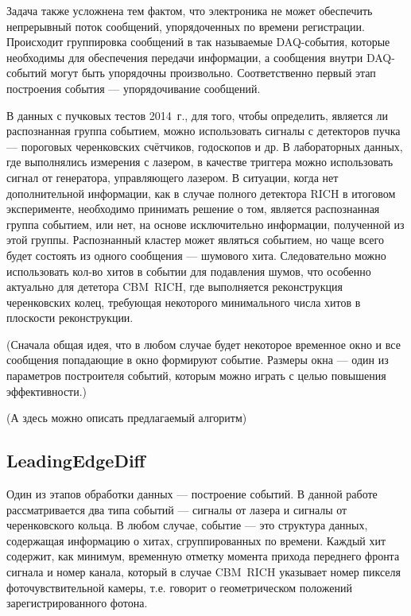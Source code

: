 Задача также усложнена тем фактом, что электроника не может обеспечить непрерывный поток сообщений, упорядоченных по времени регистрации. Происходит группировка сообщений в так называемые DAQ-события, которые необходимы для обеспечения передачи информации, а сообщения внутри DAQ-событий могут быть упорядочны произвольно. Соответственно первый этап построения события --- упорядочивание сообщений.

В данных с пучковых тестов 2014~г., для того, чтобы определить, является ли распознанная группа событием, можно использовать сигналы с детекторов пучка --- пороговых черенковских счётчиков, годоскопов и др. В лабораторных данных, где выполнялись измерения с лазером, в качестве триггера можно использовать сигнал от генератора, управляющего лазером. В ситуации, когда нет дополнительной информации, как в случае полного детектора RICH в итоговом эксперименте, необходимо принимать решение о том, является распознанная группа событием, или нет, на основе исключительно информации, полученной из этой группы. Распознанный кластер может являться событием, но чаще всего будет состоять из одного сообщения --- шумового хита. Следовательно можно использовать кол-во хитов в событии для подавления шумов, что особенно актуально для дететора CBM~RICH, где выполняется реконструкция черенковских колец, требующая некоторого минимального числа хитов в плоскости реконструкции.

(Сначала общая идея, что в любом случае будет некоторое временное окно и все сообщения попадающие в окно формируют событие. Размеры окна --- один из параметров построителя событий, которым можно играть с целью повышения эффективности.)

(А здесь можно описать предлагаемый алгоритм)

\subsection{LeadingEdgeDiff}\label{sec:secLeadingEdgeDiff}

Один из этапов обработки данных --- построение событий. В данной работе рассматривается два типа событий --- сигналы от лазера и сигналы от черенковского кольца. В любом случае, событие --- это структура данных, содержащая информацию о хитах, сгруппированных по времени. Каждый хит содержит, как минимум, временную отметку момента прихода переднего фронта сигнала и номер канала, который в случае CBM~RICH указывает номер пикселя фоточувствительной камеры, т.е. говорит о геометрическом положений зарегистрированного фотона.

